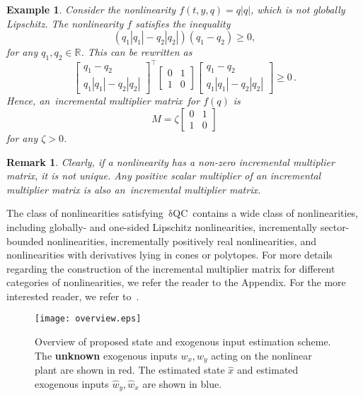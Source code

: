 \documentclass[times, doublespace]{rncauth}
\newcommand{\iqc}{$\mathrm{\delta}$QC}
\newtheorem{example}{Example}
\newtheorem{remark}{Remark}
\begin{document}
\begin{example}
Consider the nonlinearity $f(t,y,q) = q|q|$, which is not globally Lipschitz. The nonlinearity $f$ satisfies the inequality
\[
(q_1|q_1|-q_2|q_2|)(q_1-q_2) \ge 0,
\]
for any $q_1, q_2\in\mathbb R$. This 
can be rewritten as
\[
\begin{bmatrix}
q_1 - q_2 \\ q_1|q_1|-q_2|q_2|
\end{bmatrix}^\top \begin{bmatrix}
0 & 1 \\ 1 & 0
\end{bmatrix}\begin{bmatrix}
q_1 - q_2 \\ q_1|q_1|-q_2|q_2|
\end{bmatrix} \ge 0\,.
\]
  Hence, an~incremental multiplier matrix~for $f(q)$ is 
\begin{equation}\label{eq:imm2}
M= \zeta\begin{bmatrix}
0 & 1\\ 1 & 0
\end{bmatrix}
\end{equation}
for any $\zeta>0$.
\end{example}
\begin{remark}
Clearly, if a nonlinearity has a non-zero  incremental multiplier matrix, it  is not unique.
Any positive scalar multiplier of an incremental multiplier matrix is also an~incremental multiplier matrix.
\end{remark}
The class of nonlinearities satisfying~\iqc~contains a wide class of nonlinearities, including globally- and one-sided Lipschitz nonlinearities, incrementally sector-bounded nonlinearities, incrementally positively real nonlinearities, and nonlinearities with derivatives lying in cones or polytopes. For more details regarding the construction of the incremental multiplier matrix for different categories of nonlinearities, we refer the reader to the Appendix. For the more interested reader, we refer to~\cite{iqs_corless,acikmese11obs}.
\begin{figure}[!ht]
	\centering
	\texttt{[image: overview.eps]}
	\caption{Overview of proposed state and exogenous input estimation scheme. The \textbf{unknown} exogenous inputs $w_x, w_y$ acting on the nonlinear plant are shown in red. The estimated state $\hat x$ and estimated exogenous inputs $\hat w_y, \hat w_x$ are shown in blue.}
	\label{fig:overview}
\end{figure}
\end{document}
